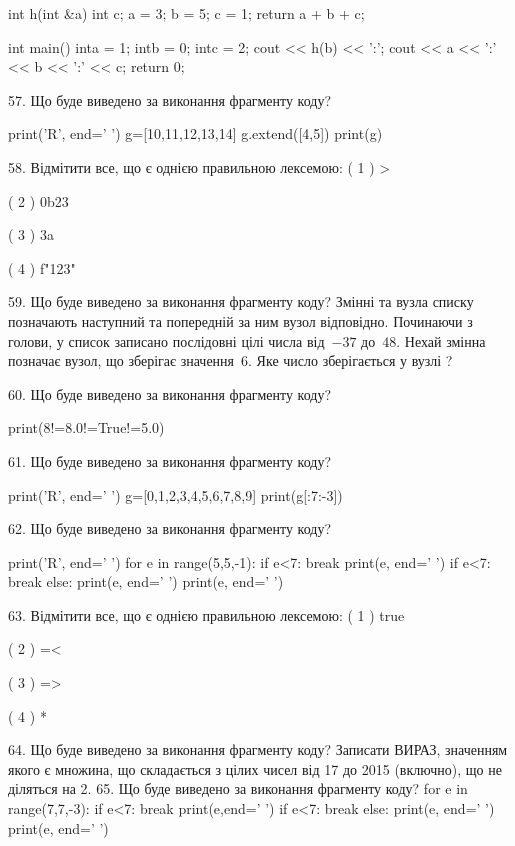 \documentclass[11pt]{article}
\begin{document}
int h(int &a){
int c;    a = 3;
    b = 5;
    c = 1;
    return a + b + c;
}

int main(){
    inta = 1;
    intb = 0;
    intc = 2;
    cout << h(b) << ':';
    cout << a << ':' << b << ':' << c;
    return 0; 
}

57. Що буде виведено за виконання фрагменту коду?

print('R', end=' ')
g=[10,11,12,13,14]
g.extend([4,5])
print(g)


58. %
Відмітити все, що є однією правильною лексемою:
( 1 ) >

( 2 ) 0b23

( 3 ) 3a

( 4 ) f"123"

59. Що буде виведено за виконання фрагменту коду?
Змінні  та  вузла списку позначають наступний та попередній за ним вузол відповідно. Починаючи з голови, у список записано послідовні цілі числа від~$-37$ до~$48$. Нехай змінна  позначає вузол, що зберігає значення~$6$.
Яке число зберігається у вузлі  ?

60. Що буде виведено за виконання фрагменту коду?

print(8!=8.0!=True!=5.0)

61. Що буде виведено за виконання фрагменту коду?

print('R', end=' ')
g=[0,1,2,3,4,5,6,7,8,9]
print(g[:7:-3])


62. Що буде виведено за виконання фрагменту коду?

print('R', end=' ')
for e in range(5,5,-1):
    if e<7:
        break
        print(e, end=' ')
    if e<7:
        break
    else:
        print(e, end=' ')
    print(e, end=' ')

63. %
Відмітити все, що є однією правильною лексемою:
( 1 ) true

( 2 ) =<

( 3 ) =>

( 4 ) *

64. Що буде виведено за виконання фрагменту коду?
Записати ВИРАЗ, значенням якого є множина, що складається з цілих чисел від 17 до 2015 (включно), що не діляться на 2.
65. Що буде виведено за виконання фрагменту коду?
for e in range(7,7,-3):
    if e<7:
        break
        print(e,end=' ')
    if e<7:
        break
else:
    print(e, end=' ')
print(e, end=' ')
\end{document}
